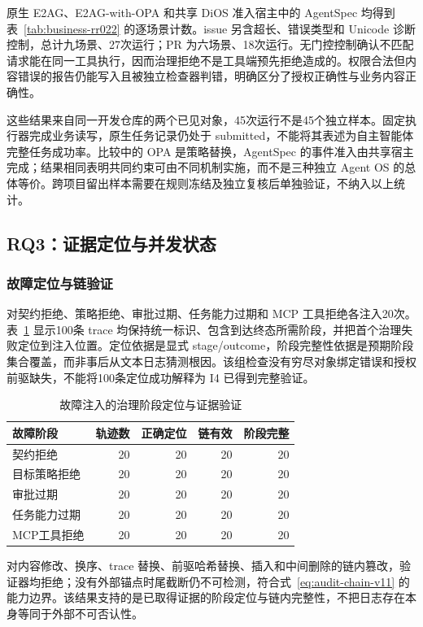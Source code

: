 原生 E2AG、E2AG-with-OPA 和共享 DiOS 准入宿主中的 AgentSpec 均得到表~\ref{tab:business-rr022} 的逐场景计数。issue 另含超长、错误类型和 Unicode 诊断控制，总计九场景、27次运行；PR 为六场景、18次运行。无门控控制确认不匹配请求能在同一工具执行，因而治理拒绝不是工具端预先拒绝造成的。权限合法但内容错误的报告仍能写入且被独立检查器判错，明确区分了授权正确性与业务内容正确性。

这些结果来自同一开发仓库的两个已见对象，45次运行不是45个独立样本。固定执行器完成业务读写，原生任务记录仍处于 submitted，不能将其表述为自主智能体完整任务成功率。比较中的 OPA 是策略替换，AgentSpec 的事件准入由共享宿主完成；结果相同表明共同约束可由不同机制实施，而不是三种独立 Agent OS 的总体等价。跨项目留出样本需要在规则冻结及独立复核后单独验证，不纳入以上统计。

\subsection{RQ3：证据定位与并发状态}

\subsubsection{故障定位与链验证}

对契约拒绝、策略拒绝、审批过期、任务能力过期和 MCP 工具拒绝各注入20次。表~\ref{tab:rq3-trace-v11} 显示100条 trace 均保持统一标识、包含到达终态所需阶段，并把首个治理失败定位到注入位置。定位依据是显式 stage/outcome，阶段完整性依据是预期阶段集合覆盖，而非事后从文本日志猜测根因。该组检查没有穷尽对象绑定错误和授权前驱缺失，不能将100条定位成功解释为 I4 已得到完整验证。

\begin{table}[htbp]
\centering
\caption{故障注入的治理阶段定位与证据验证}
\label{tab:rq3-trace-v11}
\small
\begin{tabular}{lrrrr}
\toprule
故障阶段 & 轨迹数 & 正确定位 & 链有效 & 阶段完整 \\
\midrule
契约拒绝 & 20 & 20 & 20 & 20 \\
目标策略拒绝 & 20 & 20 & 20 & 20 \\
审批过期 & 20 & 20 & 20 & 20 \\
任务能力过期 & 20 & 20 & 20 & 20 \\
MCP工具拒绝 & 20 & 20 & 20 & 20 \\
\bottomrule
\end{tabular}
\end{table}

对内容修改、换序、trace 替换、前驱哈希替换、插入和中间删除的链内篡改，验证器均拒绝；没有外部锚点时尾截断仍不可检测，符合式~\eqref{eq:audit-chain-v11} 的能力边界。该结果支持的是已取得证据的阶段定位与链内完整性，不把日志存在本身等同于外部不可否认性。

